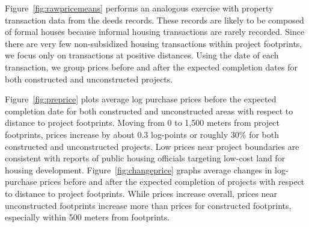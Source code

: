 \documentclass[12pt]{article}
\begin{document}
Figure~\ref{fig:rawpricemeans} performs an analogous exercise with property transaction data from the deeds records.  These records are likely to be composed of formal houses because informal housing transactions are rarely recorded.  Since there are very few non-subsidized housing transactions within project footprints, we focus only on transactions at positive distances.  Using the date of each transaction, we group prices before and after the expected completion dates for both constructed and unconstructed projects. 

Figure~\ref{fig:preprice} plots average log purchase prices before the expected completion date for both constructed and unconstructed areas with respect to distance to project footprints.  Moving from 0 to 1,500 meters from project footprints, prices increase by about 0.3 log-points or roughly 30\% for both constructed and unconstructed projects.  Low prices near project boundaries are consistent with reports of public housing officials targeting low-cost land for housing development.  Figure~\ref{fig:changeprice} graphs average changes in log-purchase prices before and after the expected completion of projects with respect to distance to project footprints.  While prices increase overall, prices near unconstructed footprints increase more than prices for constructed footprints, especially within 500 meters from footprints.  
\end{document}
